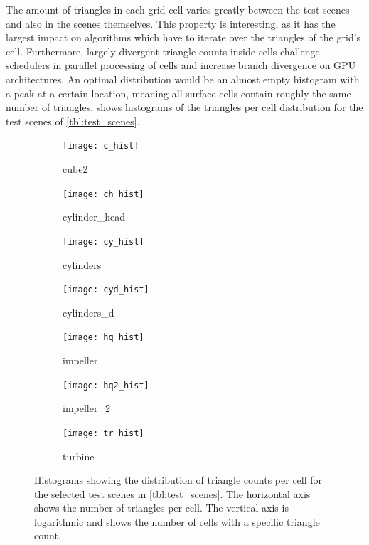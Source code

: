 The amount of triangles in each grid cell varies greatly between the test scenes and also in the scenes themselves.
This property is interesting, as it has the largest impact on algorithms which have to iterate over the triangles of the grid's cell.
Furthermore, largely divergent triangle counts inside cells challenge schedulers in parallel processing of cells and increase branch divergence on GPU architectures.
An optimal distribution would be an almost empty histogram with a peak at a certain location, meaning all surface cells contain roughly the same number of triangles.
 shows histograms of the triangles per cell distribution for the test scenes of \cref{tbl:test_scenes}.
%
\begin{figure}[!]
	\centering
	\begin{subfigure}[b]{0.49\textwidth}
		\centering
		\texttt{[image: c\_hist]}
		\caption{cube2}
		\label{fig:cube2_histogram}
	\end{subfigure}
	\begin{subfigure}[b]{0.49\textwidth}
		\centering
		\texttt{[image: ch\_hist]}
		\caption{cylinder\_head}
		\label{fig:cylinder_head_histogram}
	\end{subfigure}
	\begin{subfigure}[b]{0.49\textwidth}
		\centering
		\texttt{[image: cy\_hist]}
		\caption{cylinders}
		\label{fig:cylinders_histogram}
	\end{subfigure}
	\begin{subfigure}[b]{0.49\textwidth}
		\centering
		\texttt{[image: cyd\_hist]}
		\caption{cylinders\_d}
		\label{fig:cylinders_d_histogram}
	\end{subfigure}
	\begin{subfigure}[b]{0.49\textwidth}
		\centering
		\texttt{[image: hq\_hist]}
		\caption{impeller}
		\label{fig:impeller_histogram}
	\end{subfigure}
	\begin{subfigure}[b]{0.49\textwidth}
		\centering
		\texttt{[image: hq2\_hist]}
		\caption{impeller\_2}
		\label{fig:impeller_2_histogram}
	\end{subfigure}
	\begin{subfigure}[b]{0.49\textwidth}
		\centering
		\texttt{[image: tr\_hist]}
		\caption{turbine}
		\label{fig:turbine_histogram}
	\end{subfigure}
	\caption{
		Histograms showing the distribution of triangle counts per cell for the selected test scenes in \cref{tbl:test_scenes}.
		The horizontal axis shows the number of triangles per cell.
		The vertical axis is logarithmic and shows the number of cells with a specific triangle count.
	}
	\label{fig:histograms}
\end{figure}

